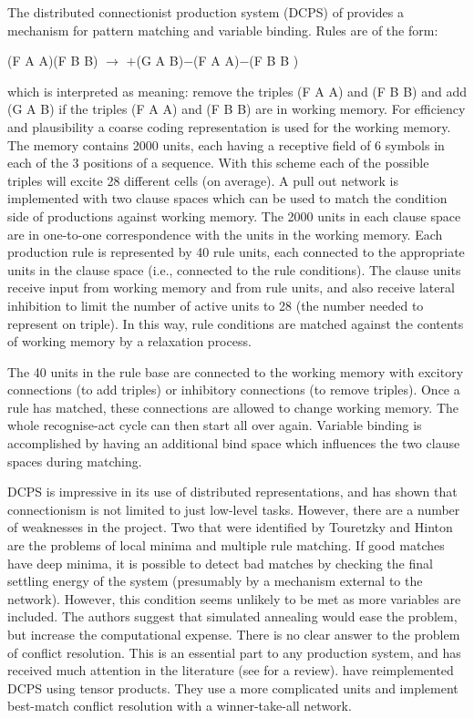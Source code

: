 The distributed connectionist production system (DCPS) of
 provides a mechanism for pattern matching and
variable binding.  Rules are of the form:
\begin{center}
(F A A)(F B B) $\rightarrow$ $+$(G A B)$-$(F A A)$-$(F B B )
\end{center}
which is interpreted as meaning: remove the triples (F A A) and (F B
B) and add (G A B) if the triples (F A A) and (F B B) are in working
memory.  For efficiency and plausibility a coarse coding
representation is used for the working memory.  The memory contains
2000 units, each having a receptive field of 6 symbols in each of the
3 positions of a sequence.  With this scheme each of the possible
triples will excite 28 different cells (on average).  A pull out
network is implemented with two clause spaces which can be used to
match the condition side of productions against working memory.  The
2000 units in each clause space are in one-to-one correspondence with
the units in the working memory.  Each production rule is represented
by 40 rule units, each connected to the appropriate units in the
clause space (i.e., connected to the rule conditions). The clause
units receive input from working memory and from rule units, and also
receive lateral inhibition to limit the number of active units to 28
(the number needed to represent on triple).  In this way, rule
conditions are matched against the contents of working memory by a
relaxation process.

The 40 units in the rule base are connected to the working memory with
excitory connections (to add triples) or inhibitory connections (to
remove triples).  Once a rule has matched, these connections are
allowed to change working memory.  The whole recognise-act cycle can
then start all over again.  Variable binding is accomplished by having
an additional bind space which influences the two clause spaces during
matching.

DCPS is impressive in its use of distributed representations, and has
shown that connectionism is not limited to just low-level tasks.
However, there are a number of weaknesses in the project. Two that
were identified by Touretzky and Hinton are the problems of local
minima and multiple rule matching.  If good matches have deep minima,
it is possible to detect bad matches by checking the final settling
energy of the system (presumably by a mechanism external to the
network).  However, this condition seems unlikely to be met as more
variables are included.  The authors suggest that simulated annealing
would ease the problem, but increase the computational expense.  There
is no clear answer to the problem of conflict resolution.  This is an
essential part to any production system, and has received much
attention in the literature (see  for a review).
 have reimplemented DCPS using tensor products.  They use
a more complicated units and implement best-match conflict resolution
with a winner-take-all network.

